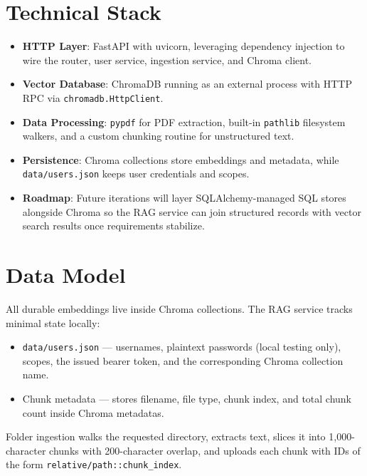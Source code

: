 \documentclass[11pt]{article}
\begin{document}
\section{Technical Stack}
\begin{itemize}[leftmargin=*]
  \item \textbf{HTTP Layer}: FastAPI with uvicorn, leveraging dependency injection to wire the router, user service, ingestion service, and Chroma client.
  \item \textbf{Vector Database}: ChromaDB running as an external process with HTTP RPC via \texttt{chromadb.HttpClient}.
  \item \textbf{Data Processing}: \texttt{pypdf} for PDF extraction, built-in \texttt{pathlib} filesystem walkers, and a custom chunking routine for unstructured text.
  \item \textbf{Persistence}: Chroma collections store embeddings and metadata, while \texttt{data/users.json} keeps user credentials and scopes.
  \item \textbf{Roadmap}: Future iterations will layer SQLAlchemy-managed SQL stores alongside Chroma so the RAG service can join structured records with vector search results once requirements stabilize.
\end{itemize}

\section{Data Model}
All durable embeddings live inside Chroma collections. The RAG service tracks minimal state locally:
\begin{itemize}[leftmargin=*]
  \item \texttt{data/users.json} --- usernames, plaintext passwords (local testing only), scopes, the issued bearer token, and the corresponding Chroma collection name.
  \item Chunk metadata --- stores filename, file type, chunk index, and total chunk count inside Chroma metadatas.
\end{itemize}
Folder ingestion walks the requested directory, extracts text, slices it into 1{,}000-character chunks with 200-character overlap, and uploads each chunk with IDs of the form \texttt{relative/path::chunk\_index}.
\end{document}
